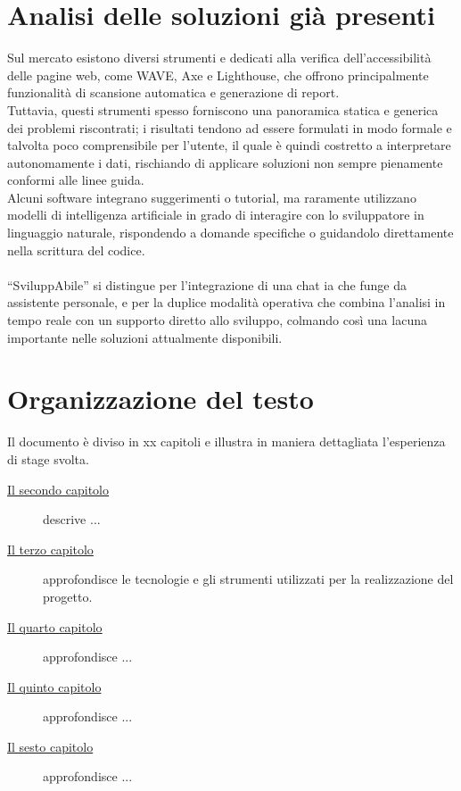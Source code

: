 \section{Analisi delle soluzioni già presenti}
Sul mercato esistono diversi strumenti e  dedicati alla verifica dell’accessibilità delle pagine web, come WAVE, Axe e Lighthouse, che offrono principalmente funzionalità di scansione automatica e generazione di report.\\ 
Tuttavia, questi strumenti spesso forniscono una panoramica statica e generica dei problemi riscontrati; i risultati tendono ad essere formulati in modo formale e talvolta poco comprensibile per l’utente, il quale è quindi costretto a interpretare autonomamente i dati, rischiando di applicare soluzioni non sempre pienamente conformi alle linee guida.\\ 
Alcuni software integrano suggerimenti o tutorial, ma raramente utilizzano modelli di intelligenza artificiale in grado di interagire con lo sviluppatore in linguaggio naturale, rispondendo a domande specifiche o guidandolo direttamente nella scrittura del codice. \\
\\
“SviluppAbile” si distingue per l’integrazione di una chat \acrshort{ia} che funge da assistente personale, e per la duplice modalità operativa che combina l’analisi in tempo reale con un supporto diretto allo sviluppo, colmando così una lacuna importante nelle soluzioni attualmente disponibili.

\section{Organizzazione del testo}
Il documento è diviso in xx capitoli e illustra in maniera dettagliata l’esperienza di stage svolta.

\begin{description}
    \item[{\hyperref[chap:analisi-requisiti]{Il secondo capitolo}}] descrive ...
    \item[{\hyperref[chap:linguaggi-tecnologie]{Il terzo capitolo}}] approfondisce le tecnologie e gli strumenti utilizzati per la realizzazione del progetto.
    \item[{\hyperref[chap:progettazione]{Il quarto capitolo}}] approfondisce ...
    \item[{\hyperref[chap:test]{Il quinto capitolo}}] approfondisce ...
    \item[{\hyperref[chap:risultato]{Il sesto capitolo}}] approfondisce ...
\end{description}


